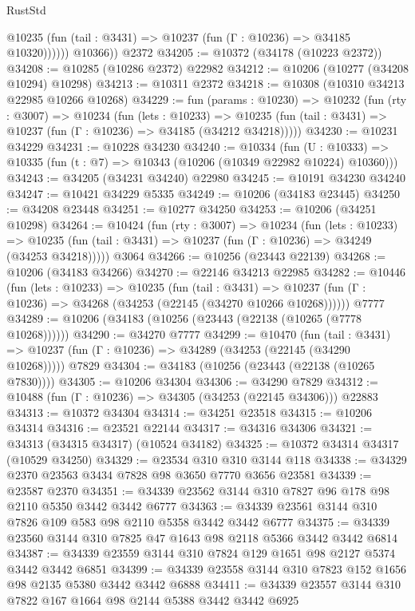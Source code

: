 \begin{lexlean}{RustStd}
\begin{coremodule}
              @10235 (fun (tail : @3431) => @10237 (fun (Γ : @10236) => @34185 @10320))))))
        @10366))
    @2372
@34205 := @10372 (@34178 (@10223 @2372))
@34208 := @10285 (@10286 @2372) @22982
@34212 := @10206 (@10277 (@34208 @10294) @10298)
@34213 := @10311 @2372
@34218 := @10308 (@10310 @34213 @22985 @10266 @10268)
@34229 := fun (params : @10230) =>
  @10232
    (fun (rty : @3007) =>
    @10234
      (fun (lets : @10233) =>
      @10235 (fun (tail : @3431) => @10237 (fun (Γ : @10236) => @34185 (@34212 @34218)))))
@34230 := @10231 @34229
@34231 := @10228 @34230
@34240 := @10334
    (fun (U : @10333) => @10335 (fun (t : @7) => @10343 (@10206 (@10349 @22982 @10224) @10360)))
@34243 := @34205 (@34231 @34240) @22980
@34245 := @10191 @34230 @34240
@34247 := @10421 @34229 @5335
@34249 := @10206 (@34183 @23445)
@34250 := @34208 @23448
@34251 := @10277 @34250
@34253 := @10206 (@34251 @10298)
@34264 := @10424
    (fun (rty : @3007) =>
    @10234
      (fun (lets : @10233) =>
      @10235 (fun (tail : @3431) => @10237 (fun (Γ : @10236) => @34249 (@34253 @34218)))))
    @3064
@34266 := @10256 (@23443 @22139)
@34268 := @10206 (@34183 @34266)
@34270 := @22146 @34213 @22985
@34282 := @10446
    (fun (lets : @10233) =>
    @10235
      (fun (tail : @3431) =>
      @10237 (fun (Γ : @10236) => @34268 (@34253 (@22145 (@34270 @10266 @10268))))))
    @7777
@34289 := @10206 (@34183 (@10256 (@23443 (@22138 (@10265 (@7778 @10268))))))
@34290 := @34270 @7777
@34299 := @10470
    (fun (tail : @3431) => @10237 (fun (Γ : @10236) => @34289 (@34253 (@22145 (@34290 @10268)))))
    @7829
@34304 := @34183 (@10256 (@23443 (@22138 (@10265 @7830))))
@34305 := @10206 @34304
@34306 := @34290 @7829
@34312 := @10488 (fun (Γ : @10236) => @34305 (@34253 (@22145 @34306))) @22883
@34313 := @10372 @34304
@34314 := @34251 @23518
@34315 := @10206 @34314
@34316 := @23521 @22144
@34317 := @34316 @34306
@34321 := @34313 (@34315 @34317) (@10524 @34182)
@34325 := @10372 @34314 @34317 (@10529 @34250)
@34329 := @23534 @310 @310 @3144 @118
@34338 := @34329 @2370 @23563 @3434 @7828 @98 @3650 @7770 @3656 @23581
@34339 := @23587 @2370
@34351 := @34339 @23562 @3144 @310 @7827 @96 @178 @98 @2110 @5350 @3442 @3442 @6777
@34363 := @34339 @23561 @3144 @310 @7826 @109 @583 @98 @2110 @5358 @3442 @3442 @6777
@34375 := @34339 @23560 @3144 @310 @7825 @47 @1643 @98 @2118 @5366 @3442 @3442 @6814
@34387 := @34339 @23559 @3144 @310 @7824 @129 @1651 @98 @2127 @5374 @3442 @3442 @6851
@34399 := @34339 @23558 @3144 @310 @7823 @152 @1656 @98 @2135 @5380 @3442 @3442 @6888
@34411 := @34339 @23557 @3144 @310 @7822 @167 @1664 @98 @2144 @5388 @3442 @3442 @6925

\end{coremodule}
\end{lexlean}
